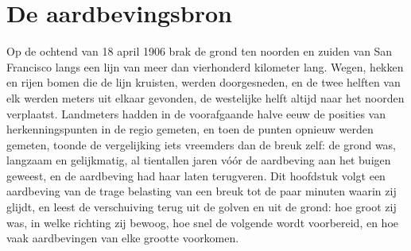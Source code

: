 \chapter{De aardbevingsbron}\label{ch:b1:earthquake-source}

Op de ochtend van 18 april 1906 brak de grond ten noorden en zuiden van San Francisco langs een lijn van meer dan vierhonderd kilometer lang. Wegen, hekken en rijen bomen die de lijn kruisten, werden doorgesneden, en de twee helften van elk werden meters uit elkaar gevonden, de westelijke helft altijd naar het noorden verplaatst. Landmeters hadden in de voorafgaande halve eeuw de posities van herkenningspunten in de regio gemeten, en toen de punten opnieuw werden gemeten, toonde de vergelijking iets vreemders dan de breuk zelf: de grond was, langzaam en gelijkmatig, al tientallen jaren vóór de aardbeving aan het buigen geweest, en de aardbeving had haar laten terugveren. Dit hoofdstuk volgt een aardbeving van de trage belasting van een breuk tot de paar minuten waarin zij glijdt, en leest de verschuiving terug uit de golven en uit de grond: hoe groot zij was, in welke richting zij bewoog, hoe snel de volgende wordt voorbereid, en hoe vaak aardbevingen van elke grootte voorkomen.

